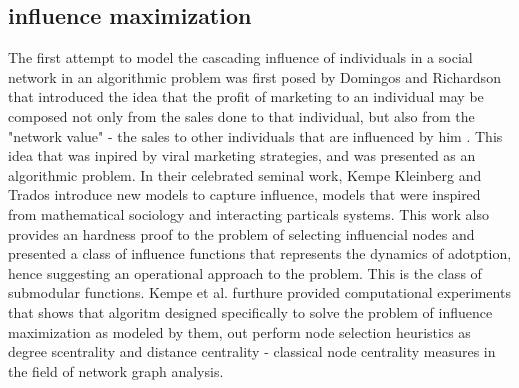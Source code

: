 \subsection{influence maximization}\label{sec:inf}
The first attempt to model the cascading influence of individuals in a social network in an algorithmic problem was first posed by Domingos and Richardson that introduced the idea that the profit of marketing to an individual may be composed not only from the sales done to that individual, but also from the "network value" - the sales to other individuals that are influenced by him \cite{domingos2001mining}. This idea that was inpired by viral marketing strategies, and was presented as an algorithmic problem.
In their celebrated seminal work, Kempe Kleinberg and Trados \cite{kempe2003maximizing} introduce new models to capture influence, models that were inspired from mathematical sociology and interacting particals systems. This work also provides an hardness proof to the problem of selecting influencial nodes and presented a class of influence functions that represents the dynamics of adotption, hence suggesting an operational approach to the problem. This is the class of submodular functions. 
Kempe et al. furthure provided computational experiments that shows that algoritm designed specifically to solve the problem of influence maximization as modeled by them, out perform node selection heuristics as degree scentrality and distance centrality - classical node centrality measures in the field of network graph analysis.

